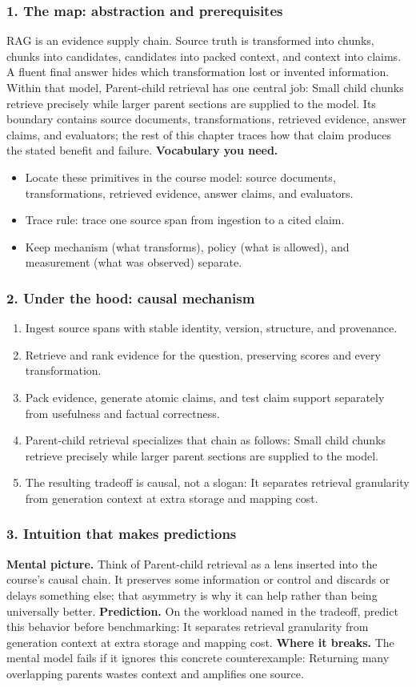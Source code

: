 \subsubsection*{1. The map: abstraction and prerequisites}
RAG is an evidence supply chain. Source truth is transformed into chunks, chunks into candidates, candidates into packed context, and context into claims. A fluent final answer hides which transformation lost or invented information.
Within that model, Parent-child retrieval has one central job: Small child chunks retrieve precisely while larger parent sections are supplied to the model. Its boundary contains source documents, transformations, retrieved evidence, answer claims, and evaluators; the rest of this chapter traces how that claim produces the stated benefit and failure.
\textbf{Vocabulary you need.}\begin{itemize}
\item Locate these primitives in the course model: source documents, transformations, retrieved evidence, answer claims, and evaluators.
\item Trace rule: trace one source span from ingestion to a cited claim.
\item Keep mechanism (what transforms), policy (what is allowed), and measurement (what was observed) separate.
\end{itemize}
\subsubsection*{2. Under the hood: causal mechanism}\begin{enumerate}
\item Ingest source spans with stable identity, version, structure, and provenance.
\item Retrieve and rank evidence for the question, preserving scores and every transformation.
\item Pack evidence, generate atomic claims, and test claim support separately from usefulness and factual correctness.
\item Parent-child retrieval specializes that chain as follows: Small child chunks retrieve precisely while larger parent sections are supplied to the model.
\item The resulting tradeoff is causal, not a slogan: It separates retrieval granularity from generation context at extra storage and mapping cost.
\end{enumerate}
\subsubsection*{3. Intuition that makes predictions}
\textbf{Mental picture.} Think of Parent-child retrieval as a lens inserted into the course's causal chain. It preserves some information or control and discards or delays something else; that asymmetry is why it can help rather than being universally better.
\textbf{Prediction.} On the workload named in the tradeoff, predict this behavior before benchmarking: It separates retrieval granularity from generation context at extra storage and mapping cost.
\textbf{Where it breaks.} The mental model fails if it ignores this concrete counterexample: Returning many overlapping parents wastes context and amplifies one source.
